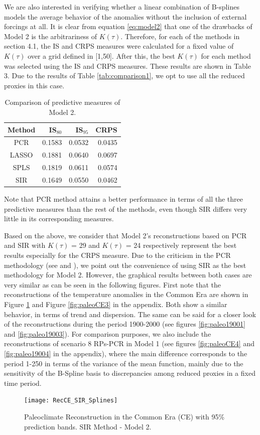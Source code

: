 \documentclass[11pt]{amsart}
\theoremstyle{plain}
\theoremstyle{definition}
\theoremstyle{remark}
\begin{document}
We are also interested in verifying whether a linear combination of B-splines
models the average behavior of the anomalies without the inclusion of external
forcings at all. It is clear from equation \eqref{eq:model2} that one of the
drawbacks of Model 2 is the arbitrariness of $K(\tau)$. Therefore, for each of
the methods in section 4.1, the IS and CRPS measures were calculated for a fixed
value of $K(\tau)$ over a grid defined in [1,50]. After this, the best $K(\tau)$
for each method was selected using the IS and CRPS measures. These results are
shown in Table 3. Due to the results of Table \ref{tab:comparison1}, we opt to
use all the reduced proxies in this case.
\begin{table}
  \centering
  \begin{tabular}{c|rrr}
  \toprule
Method  & IS$_{80}$ & IS$_{95}$ & CRPS \\ 
  \midrule
PCR & 0.1583 & 0.0532 & 0.0435 \\ 
  LASSO & 0.1881 & 0.0640 & 0.0697 \\ 
  SPLS & 0.1819 & 0.0611 & 0.0574 \\ 
  SIR & 0.1649 & 0.0550 & 0.0462 \\ 
   \bottomrule
\end{tabular}
  \caption{Comparison of predictive measures of Model 2.}
  \label{tab:comparison2}
\end{table}
Note that PCR method attains a better performance in terms of all the three
predictive measures than the
rest of the methods, even though SIR differs very little in its corresponding
measures. 

Based on the above, we consider that Model 2's reconstructions based on PCR and SIR
with $K(\tau)$ = 29 and $K(\tau)$ = 24 respectively represent the best results
especially for the CRPS measure. Due to the criticism in the PCR methodology
(see \cite{Jolliffe1982} and \cite{Tibshirani1996}), we point out the convenience of using SIR as the best methodology for
Model 2. However, the graphical results between both cases are very similar as
can be seen in the following figures. First note that the reconstructions of the
temperature anomalies in the Common Era are shown in
Figure \ref{fig:paleoCE1} and Figure \ref{fig:paleoCE3} in the appendix. Both
show a similar behavior, in terms of trend and dispersion. The same can be said
for a closer look of the reconstructions during the period 1900-2000 (see
figures \ref{fig:paleo19001} and \ref{fig:paleo19003}). For comparison purposes,
we also include the reconstructions of scenario 8 RPs-PCR in Model 1 (see
figures \ref{fig:paleoCE4} and \ref{fig:paleo19004} in the appendix), where the
main difference corresponds to the period 1-250 in terms of the variance of the
mean function, mainly due to the sensitivity of the B-Spline basis to
discrepancies among reduced proxies in a fixed time period.  
\begin{figure}
  \centering
  \texttt{[image: RecCE\_SIR\_Splines]}
  \caption{Paleoclimate Reconstruction in the Common Era (CE) with 95\%
    prediction bands. SIR Method - Model 2.}
  \label{fig:paleoCE1}
\end{figure}
\end{document}
